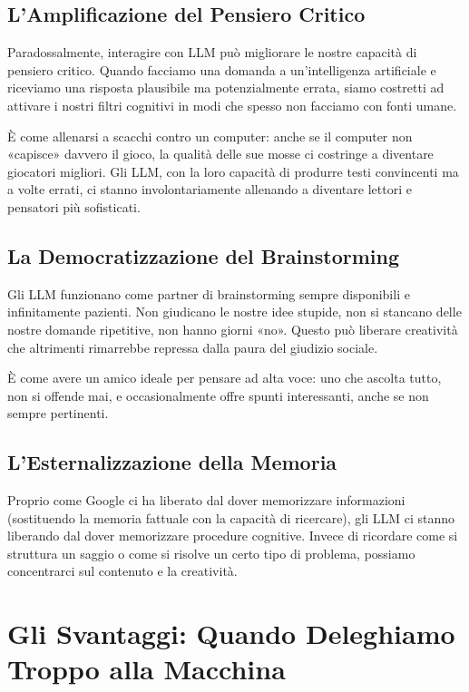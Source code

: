 \subsection{L'Amplificazione del Pensiero Critico}

Paradossalmente, interagire con LLM può migliorare le nostre capacità di pensiero critico. Quando facciamo una domanda a un'intelligenza artificiale e riceviamo una risposta plausibile ma potenzialmente errata, siamo costretti ad attivare i nostri filtri cognitivi in modi che spesso non facciamo con fonti umane.

È come allenarsi a scacchi contro un computer: anche se il computer non «capisce» davvero il gioco, la qualità delle sue mosse ci costringe a diventare giocatori migliori. Gli LLM, con la loro capacità di produrre testi convincenti ma a volte errati, ci stanno involontariamente allenando a diventare lettori e pensatori più sofisticati.

\subsection{La Democratizzazione del Brainstorming}

Gli LLM funzionano come partner di brainstorming sempre disponibili e infinitamente pazienti. Non giudicano le nostre idee stupide, non si stancano delle nostre domande ripetitive, non hanno giorni «no». Questo può liberare creatività che altrimenti rimarrebbe repressa dalla paura del giudizio sociale.

È come avere un amico ideale per pensare ad alta voce: uno che ascolta tutto, non si offende mai, e occasionalmente offre spunti interessanti, anche se non sempre pertinenti.

\subsection{L'Esternalizzazione della Memoria}

Proprio come Google ci ha liberato dal dover memorizzare informazioni (sostituendo la memoria fattuale con la capacità di ricercare), gli LLM ci stanno liberando dal dover memorizzare procedure cognitive. Invece di ricordare come si struttura un saggio o come si risolve un certo tipo di problema, possiamo concentrarci sul contenuto e la creatività.

\section{Gli Svantaggi: Quando Deleghiamo Troppo alla Macchina}
\label{sec:p3c23-svantaggi}

